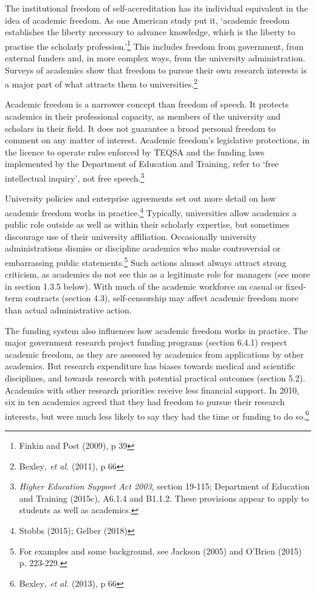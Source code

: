 \documentclass[]{book}
\begin{document}
The institutional freedom of self-accreditation has its individual equivalent in the idea of academic freedom. As one American study put it, `academic freedom establishes the liberty necessary to advance knowledge, which is the liberty to practise the scholarly profession.'\footnote{Finkin and Post (2009), p 39} This includes freedom from government, from external funders and, in more complex ways, from the university administration. Surveys of academics show that freedom to pursue their own research interests is a major part of what attracts them to universities.\footnote{Bexley\emph{, et al.} (2011), p 66}

Academic freedom is a narrower concept than freedom of speech. It protects academics in their professional capacity, as members of the university and scholars in their field. It does not guarantee a broad personal freedom to comment on any matter of interest. Academic freedom's legislative protections, in the licence to operate rules enforced by TEQSA and the funding laws implemented by the Department of Education and Training, refer to `free intellectual inquiry', not free speech.\footnote{\emph{Higher Education Support Act 2003}, section 19-115; Department of Education and Training (2015c), A6.1.4 and B1.1.2. These provisions appear to apply to students as well as academics.}

University policies and enterprise agreements set out more detail on how academic freedom works in practice.\footnote{Stobbs (2015); Gelber (2018)} Typically, universities allow academics a public role outside as well as within their scholarly expertise, but sometimes discourage use of their university affiliation. Occasionally university administrations dismiss or discipline academics who make controversial or embarrassing public statements.\footnote{For examples and some background, see Jackson (2005) and O'Brien (2015) p. 223-229.} Such actions almost always attract strong criticism, as academics do not see this as a legitimate role for managers (see more in section 1.3.5 below). With much of the academic workforce on casual or fixed-term contracts (section 4.3), self-censorship may affect academic freedom more than actual administrative action.

The funding system also influences how academic freedom works in practice. The major government research project funding programs (section 6.4.1) respect academic freedom, as they are assessed by academics from applications by other academics. But research expenditure has biases towards medical and scientific disciplines, and towards research with potential practical outcomes (section 5.2). Academics with other research priorities receive less financial support. In 2010, six in ten academics agreed that they had freedom to pursue their research interests, but were much less likely to say they had the time or funding to do so.\footnote{Bexley\emph{, et al.} (2013), p 66}
\end{document}
